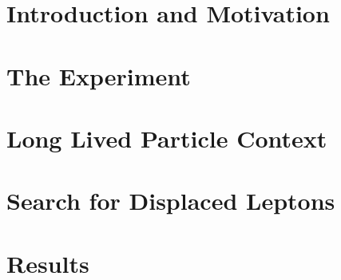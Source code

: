 \documentclass{ucetd}
\begin{document}
\mainmatter



\part{Introduction and Motivation}



\cleardoublepage 

\part{The Experiment}






\cleardoublepage 

\part{Long Lived Particle Context}



\cleardoublepage
\part{Search for Displaced Leptons}




\cleardoublepage
\part{Results}





\cleardoublepage 
\singlespacing
\printbibliography[heading=bibintoc,title={References}]

%
%
\end{document}
